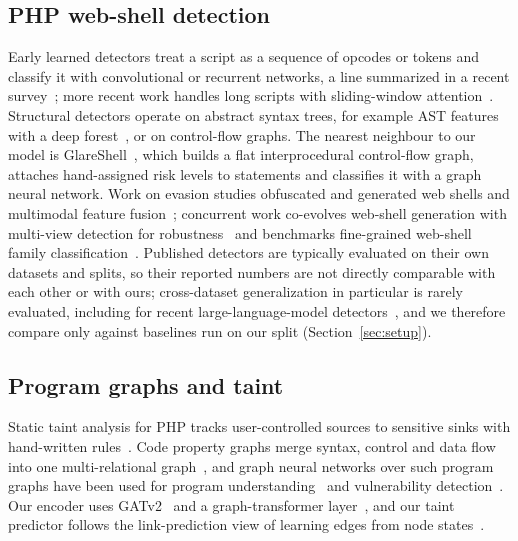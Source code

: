 \documentclass[pdflatex,sn-mathphys-num]{sn-jnl}
\begin{document}
\subsection{PHP web-shell detection}
Early learned detectors treat a script as a sequence of opcodes or tokens and
classify it with convolutional or recurrent networks, a line summarized in a
recent survey~\cite{survey2024}; more recent work handles long scripts with
sliding-window attention~\cite{wang2025slidingwindow}. Structural detectors
operate on abstract syntax trees, for example AST features with a deep
forest~\cite{astdf2024}, or on control-flow graphs. The nearest neighbour to
our model is GlareShell~\cite{glareshell2024}, which builds a flat
interprocedural control-flow graph, attaches hand-assigned risk levels to
statements and classifies it with a graph neural network. Work on evasion
studies obfuscated and generated web shells and multimodal feature
fusion~\cite{mmfdetect2025}; concurrent work co-evolves web-shell generation
with multi-view detection for robustness~\cite{ding2026shellforge} and
benchmarks fine-grained web-shell family classification~\cite{han2025familyclass}.
Published detectors are typically evaluated on their own datasets and splits,
so their reported numbers are not directly comparable with each other or with
ours; cross-dataset generalization in particular is rarely evaluated, including
for recent large-language-model detectors~\cite{han2025llmwebshell}, and we
therefore compare only against baselines run on our split
(Section~\ref{sec:setup}).

\subsection{Program graphs and taint}
Static taint analysis for PHP tracks user-controlled sources to sensitive
sinks with hand-written rules~\cite{jovanovic2006pixy}. Code property graphs
merge syntax, control and data flow into one multi-relational
graph~\cite{yamaguchi2014cpg}, and graph neural networks over such program
graphs have been used for program understanding~\cite{allamanis2018graphs} and
vulnerability detection~\cite{zhou2019devign}. Our encoder uses
GATv2~\cite{brody2022gatv2} and a graph-transformer
layer~\cite{shi2021unimp}, and our taint predictor follows the link-prediction
view of learning edges from node states~\cite{zhang2018seal}.
\end{document}
